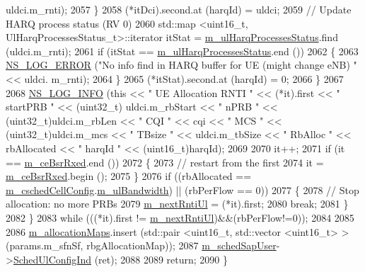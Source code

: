 \begin{DoxyCode}
      uldci.m\_rnti);
2057             \}
2058           (*itDci).second.at (harqId) = uldci;
2059           \textcolor{comment}{// Update HARQ process status (RV 0)}
2060           std::map <uint16\_t, UlHarqProcessesStatus\_t>::iterator itStat = 
      \hyperlink{classns3_1_1FdTbfqFfMacScheduler_aa02927d2f9ea374d54c0fff160b5dbbc}{m\_ulHarqProcessesStatus}.find (uldci.m\_rnti);
2061           \textcolor{keywordflow}{if} (itStat == \hyperlink{classns3_1_1FdTbfqFfMacScheduler_aa02927d2f9ea374d54c0fff160b5dbbc}{m\_ulHarqProcessesStatus}.end ())
2062             \{
2063               \hyperlink{group__logging_ga0261a8db1d4ac5f79417d117634fd455}{NS\_LOG\_ERROR} (\textcolor{stringliteral}{"No info find in HARQ buffer for UE (might change eNB) "} << uldci.
      m\_rnti);
2064             \}
2065           (*itStat).second.at (harqId) = 0;
2066         \}
2067 
2068       \hyperlink{group__logging_gafbd73ee2cf9f26b319f49086d8e860fb}{NS\_LOG\_INFO} (\textcolor{keyword}{this} << \textcolor{stringliteral}{" UE Allocation RNTI "} << (*it).first << \textcolor{stringliteral}{" startPRB "} << (uint32\_t)
      uldci.m\_rbStart << \textcolor{stringliteral}{" nPRB "} << (uint32\_t)uldci.m\_rbLen << \textcolor{stringliteral}{" CQI "} << cqi << \textcolor{stringliteral}{" MCS "} << (uint32\_t)uldci.m\_mcs 
      << \textcolor{stringliteral}{" TBsize "} << uldci.m\_tbSize << \textcolor{stringliteral}{" RbAlloc "} << rbAllocated << \textcolor{stringliteral}{" harqId "} << (uint16\_t)harqId);
2069 
2070       it++;
2071       \textcolor{keywordflow}{if} (it == \hyperlink{classns3_1_1FdTbfqFfMacScheduler_a4affe9fe434a4cb87f5875ddf1766d61}{m\_ceBsrRxed}.end ())
2072         \{
2073           \textcolor{comment}{// restart from the first}
2074           it = \hyperlink{classns3_1_1FdTbfqFfMacScheduler_a4affe9fe434a4cb87f5875ddf1766d61}{m\_ceBsrRxed}.begin ();
2075         \}
2076       \textcolor{keywordflow}{if} ((rbAllocated == \hyperlink{classns3_1_1FdTbfqFfMacScheduler_a73d5d866713fa06e1cc6186b0f556693}{m\_cschedCellConfig}.\hyperlink{structns3_1_1FfMacCschedSapProvider_1_1CschedCellConfigReqParameters_a5ab5b102878e6e7e7727a14af4a64d2f}{m\_ulBandwidth}) || (rbPerFlow ==
       0))
2077         \{
2078           \textcolor{comment}{// Stop allocation: no more PRBs}
2079           \hyperlink{classns3_1_1FdTbfqFfMacScheduler_adcaedd73d9597af47782db5e9f605544}{m\_nextRntiUl} = (*it).first;
2080           \textcolor{keywordflow}{break};
2081         \}
2082     \}
2083   \textcolor{keywordflow}{while} (((*it).first != \hyperlink{classns3_1_1FdTbfqFfMacScheduler_adcaedd73d9597af47782db5e9f605544}{m\_nextRntiUl})&&(rbPerFlow!=0));
2084 
2085 
2086   \hyperlink{classns3_1_1FdTbfqFfMacScheduler_a5f22054304388f5f9469e3591b3bedea}{m\_allocationMaps}.insert (std::pair <uint16\_t, std::vector <uint16\_t> > (params.m\_sfnSf, 
      rbgAllocationMap));
2087   \hyperlink{classns3_1_1FdTbfqFfMacScheduler_adba18bbdd7247045a60bda41322253c5}{m\_schedSapUser}->\hyperlink{classns3_1_1FfMacSchedSapUser_a1b89636256701a84d990db7db8aea874}{SchedUlConfigInd} (ret);
2088 
2089   \textcolor{keywordflow}{return};
2090 \}
\end{DoxyCode}


